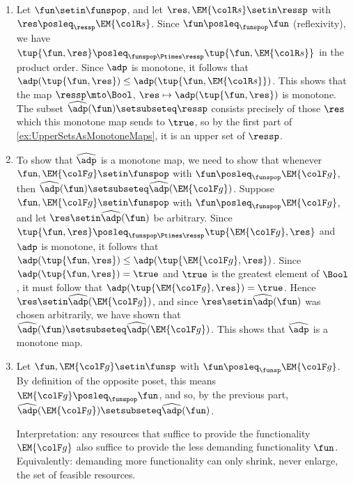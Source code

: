 \begin{gradedsolution}
\begin{enumerate}
    \item Let $\fun \setin \funspop$, and let $\res, \EM{{\colR s}} \setin \ressp$ with $\res \posleq_{\ressp} \EM{{\colR s}}$.
    Since $\fun \posleq_{\funspop} \fun$ (reflexivity), we have $\tup{\fun, \res} \posleq_{\funspop \Ptimes \ressp} \tup{\fun, \EM{{\colR s}}}$ in the product order.
    Since $\adp$ is monotone, it follows that $\adp(\tup{\fun, \res}) \leq \adp(\tup{\fun, \EM{{\colR s}}})$.
    This shows that the map $\ressp \mto \Bool$, $\res \mapsto \adp(\tup{\fun, \res})$ is monotone.
    The subset $\widehat{\adp}(\fun) \setsubseteq \ressp$ consists precisely of those $\res$ which this monotone map sends to $\true$, so by the first part of \cref{ex:UpperSetsAsMonotoneMaps}, it is an upper set of $\ressp$.

    \item To show that $\widehat{\adp}$ is a monotone map, we need to show that whenever $\fun, \EM{{\colF g}} \setin \funspop$ with $\fun \posleq_{\funspop} \EM{{\colF g}}$, then $\widehat{\adp}(\fun) \setsubseteq \widehat{\adp}(\EM{{\colF g}})$.
    Suppose $\fun, \EM{{\colF g}} \setin \funspop$ with $\fun \posleq_{\funspop} \EM{{\colF g}}$, and let $\res \setin \widehat{\adp}(\fun)$ be arbitrary.
    Since $\tup{\fun, \res} \posleq_{\funspop \Ptimes \ressp} \tup{\EM{{\colF g}}, \res}$ and $\adp$ is monotone, it follows that $\adp(\tup{\fun, \res}) \leq \adp(\tup{\EM{{\colF g}}, \res})$.
    Since $\adp(\tup{\fun, \res}) = \true$ and $\true$ is the greatest element of $\Bool$, it must follow that $\adp(\tup{\EM{{\colF g}}, \res}) = \true$.
    Hence $\res \setin \widehat{\adp}(\EM{{\colF g}})$, and since $\res \setin \widehat{\adp}(\fun)$ was chosen arbitrarily, we have shown that $\widehat{\adp}(\fun) \setsubseteq \widehat{\adp}(\EM{{\colF g}})$.
    This shows that $\widehat{\adp}$ is a monotone map.

    \item Let $\fun, \EM{{\colF g}} \setin \funsp$ with $\fun \posleq_{\funsp} \EM{{\colF g}}$.
    By definition of the opposite poset, this means $\EM{{\colF g}} \posleq_{\funspop} \fun$, and so, by the previous part, $\widehat{\adp}(\EM{{\colF g}}) \setsubseteq \widehat{\adp}(\fun)$.

    Interpretation: any resources that suffice to provide the functionality $\EM{{\colF g}}$ also suffice to provide the less demanding functionality $\fun$.
    Equivalently: demanding more functionality can only shrink, never enlarge, the set of feasible resources.
\end{enumerate}
\end{gradedsolution}
